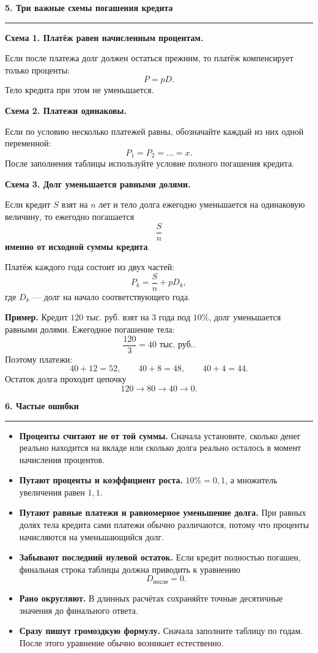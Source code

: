 \documentclass[a4paper,12pt]{article}
\newcommand{\sectiontitle}[1]{%
  \vspace{0.4em}
  {\Large\bfseries\color{darkaccent}#1}\par
  \vspace{0.15em}
  {\color{accent}\rule{\linewidth}{0.6pt}}\par
  \vspace{0.25em}
}
\newcommand{\checkitem}{\item[$\square$]}
\newcommand{\thrub}{\text{ тыс. руб.}}
\begin{document}
\sectiontitle{5. Три важные схемы погашения кредита}

\textbf{Схема 1. Платёж равен начисленным процентам.}

Если после платежа долг должен остаться прежним, то платёж компенсирует только проценты:
\[
P=pD.
\]
Тело кредита при этом не уменьшается.

\medskip

\textbf{Схема 2. Платежи одинаковы.}

Если по условию несколько платежей равны, обозначайте каждый из них одной переменной:
\[
P_1=P_2=\dots=x.
\]
После заполнения таблицы используйте условие полного погашения кредита.

\medskip

\textbf{Схема 3. Долг уменьшается равными долями.}

Если кредит \(S\) взят на \(n\) лет и тело долга ежегодно уменьшается на одинаковую величину,
то ежегодно погашается
\[
\frac{S}{n}
\]
\textbf{именно от исходной суммы кредита}.

Платёж каждого года состоит из двух частей:
\[
P_k=\frac{S}{n}+pD_k,
\]
где \(D_k\) --- долг на начало соответствующего года.

\textbf{Пример.}
Кредит \(120\thrub\) взят на 3 года под \(10\%\), долг уменьшается равными долями.
Ежегодное погашение тела:
\[
\frac{120}{3}=40\thrub.
\]
Поэтому платежи:
\[
40+12=52,\qquad
40+8=48,\qquad
40+4=44.
\]
Остаток долга проходит цепочку
\[
120\to80\to40\to0.
\]

\sectiontitle{6. Частые ошибки}

\begin{itemize}
\checkitem \textbf{Проценты считают не от той суммы.}
Сначала установите, сколько денег реально находится на вкладе или сколько долга реально осталось
в момент начисления процентов.

\checkitem \textbf{Путают проценты и коэффициент роста.}
\(10\%=0{,}1\), а множитель увеличения равен \(1{,}1\).

\checkitem \textbf{Путают равные платежи и равномерное уменьшение долга.}
При равных долях тела кредита сами платежи обычно различаются, потому что проценты начисляются на уменьшающийся долг.

\checkitem \textbf{Забывают последний нулевой остаток.}
Если кредит полностью погашен, финальная строка таблицы должна приводить к уравнению
\[
D_{\text{после}}=0.
\]

\checkitem \textbf{Рано округляют.}
В длинных расчётах сохраняйте точные десятичные значения до финального ответа.

\checkitem \textbf{Сразу пишут громоздкую формулу.}
Сначала заполните таблицу по годам. После этого уравнение обычно возникает естественно.
\end{itemize}
\end{document}
